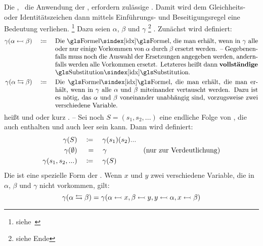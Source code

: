 {%
Die , \textdh\ die Anwendung der \Schlussregeln, erfordern zulässige \Substitutionen.
Damit wird dem Gleichheits- oder Identitätszeichen \chrqt{$\eq$} dann mittels Einführungs- und Beseitigungsregel eine Bedeutung verliehen.%
\footnote{siehe~\cite{bib:NatuerlichesSchliessen}}
Dazu seien $\alpha$, $\beta$ und $\gamma$ %
\footnote{siehe Ende }
\Formeln.
Zunächst wird definiert:
\begin{align}
	\gamma(\alpha \subst \beta) \quad \defeq \quad
	\parbox[t]{11cm}{%
		Die \Formel, die man erhält, wenn in $\gamma$ alle oder nur einige Vorkommen von $\alpha$ durch $\beta$ ersetzt werden.
		-- Gegebenenfalls muss noch die Auswahl der Ersetzungen angegeben werden, andernfalls werden alle Vorkommen ersetzt.
		Letzteres heißt dann \defn{vollständige} \Substitution.
	} \label{def:Substitution}\\
	\gamma(\alpha \swap \beta) \quad \defeq \quad
	\parbox[t]{11cm}{%
		Die \Formel, die man erhält, die man erhält, wenn in $\gamma$ alle $\alpha$ und $\beta$ miteinander vertauscht werden.
		Dazu ist es nötig, das $\alpha$ und $\beta$ voneinander unabhängig sind, vorzugsweise zwei verschiedene Variable.
	} \label{def:Vertauschung}
\end{align}
\seqqt{$ \alpha \subst \beta $} heißt  und \seqqt{$ \alpha \swap \beta $}  oder kurz .
-- Sei noch $S = (s_1, s_2, ...)$ eine endliche Folge von \Substitutionen, die auch  enthalten und auch leer sein kann. Dann wird definiert:
\begin{align}
	\gamma(S) & \quad \coloneqq \quad \gamma(s_1)(s_2)... \label{def:Substitutionen}\\
	\gamma(\emptyset) & \quad \; = \quad \gamma & \text{(nur zur Verdeutlichung)}\\
	\gamma(s_1,s_2,...) & \quad \coloneqq \quad \gamma(S)
\end{align}
%
Die  ist eine spezielle Form der \Substitution.
Wenn $x$ und $y$ zwei verschiedene Variable, die in $\alpha$, $\beta$ und $\gamma$ nicht vorkommen, gilt:
\[
	\gamma(\alpha \leftrightarrows \beta) = \gamma(\alpha\leftarrowtail x, \beta\leftarrowtail y,  y\leftarrowtail\alpha, x \leftarrowtail\beta)
\]

}
